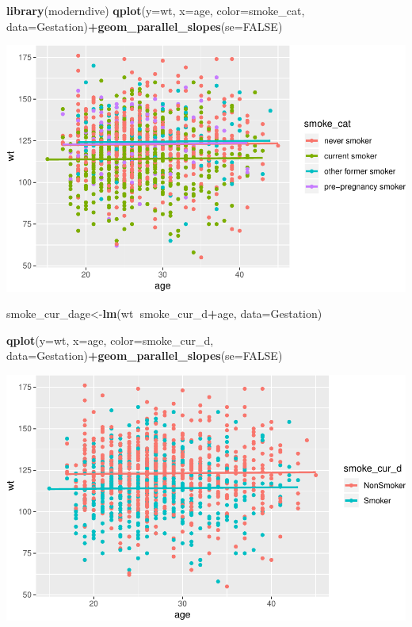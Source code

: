 \documentclass[]{article}
\newenvironment{Shaded}{\begin{snugshade}}{\end{snugshade}}
\newcommand{\DataTypeTok}[1]{\textcolor[rgb]{0.13,0.29,0.53}{#1}}
\newcommand{\KeywordTok}[1]{\textcolor[rgb]{0.13,0.29,0.53}{\textbf{#1}}}
\newcommand{\NormalTok}[1]{#1}
\newcommand{\OperatorTok}[1]{\textcolor[rgb]{0.81,0.36,0.00}{\textbf{#1}}}
\newcommand{\OtherTok}[1]{\textcolor[rgb]{0.56,0.35,0.01}{#1}}
\begin{document}
\begin{Shaded}
\begin{Highlighting}[]
\KeywordTok{library}\NormalTok{(moderndive)}
\KeywordTok{qplot}\NormalTok{(}\DataTypeTok{y=}\NormalTok{wt, }\DataTypeTok{x=}\NormalTok{age, }\DataTypeTok{color=}\NormalTok{smoke_cat, }\DataTypeTok{data=}\NormalTok{Gestation)}\OperatorTok{+}\KeywordTok{geom_parallel_slopes}\NormalTok{(}\DataTypeTok{se=}\OtherTok{FALSE}\NormalTok{)}
\end{Highlighting}
\end{Shaded}

\includegraphics{10_Lab_Answers_files/figure-latex/unnamed-chunk-10-1.pdf}

\begin{Shaded}
\begin{Highlighting}[]
\NormalTok{smoke_cur_dage<-}\KeywordTok{lm}\NormalTok{(wt}\OperatorTok{~}\NormalTok{smoke_cur_d}\OperatorTok{+}\NormalTok{age, }\DataTypeTok{data=}\NormalTok{Gestation)}
\end{Highlighting}
\end{Shaded}

\begin{Shaded}
\begin{Highlighting}[]
\KeywordTok{qplot}\NormalTok{(}\DataTypeTok{y=}\NormalTok{wt, }\DataTypeTok{x=}\NormalTok{age, }\DataTypeTok{color=}\NormalTok{smoke_cur_d, }\DataTypeTok{data=}\NormalTok{Gestation)}\OperatorTok{+}\KeywordTok{geom_parallel_slopes}\NormalTok{(}\DataTypeTok{se=}\OtherTok{FALSE}\NormalTok{)}
\end{Highlighting}
\end{Shaded}

\includegraphics{10_Lab_Answers_files/figure-latex/unnamed-chunk-11-1.pdf}
\end{document}
